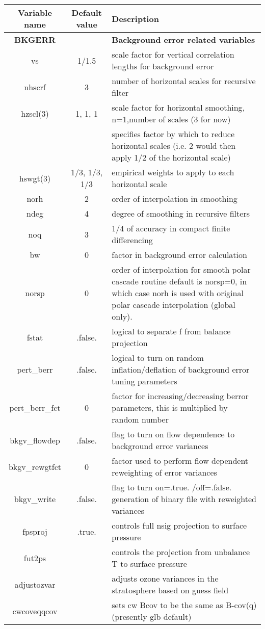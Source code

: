 \begin{table}[h]
 \footnotesize
 \center
 \begin{tabular}{| c | c | p{9cm} |}
 \hline
 Variable name & Default value & Description \\
 \hline
\textbf{BKGERR} &   & \textbf{Background error related variables} \\
 \hline 
 vs & 1/1.5 & scale factor for vertical correlation lengths for background error \\
 \hline
 nhscrf & 3	& number of horizontal scales for recursive filter \\
 \hline
 hzscl(3) & 1, 1, 1 & scale factor for horizontal smoothing, n=1,number of scales (3 for now) \\
         & & specifies factor by which to reduce horizontal scales (i.e. 2 would then apply 1/2 of the horizontal scale) \\
 \hline
 hswgt(3) & 1/3, 1/3, 1/3 & empirical weights to apply to each horizontal scale \\
 \hline
 norh & 2 & order of interpolation in smoothing \\
 \hline
 ndeg & 4 & degree of smoothing in recursive filters \\
 \hline
 noq & 3 & 1/4 of accuracy in compact finite differencing \\
 \hline
 bw & 0	& factor in background error calculation \\
 \hline
 norsp & 0 & order of interpolation for smooth polar cascade routine default is norsp=0, in which case norh is used with original polar cascade interpolation (global only). \\
 \hline
 fstat & .false. & logical to separate f from balance projection \\
 \hline
 pert\_berr	& .false. & logical to turn on random inflation/deflation of background error tuning parameters \\
 \hline
 pert\_berr\_fct & 0 & factor for increasing/decreasing berror parameters, this is multiplied by random number \\
 \hline
 bkgv\_flowdep & .false. & flag to turn on flow dependence to background error variances \\
 \hline
 bkgv\_rewgtfct & 0 & factor used to perform flow dependent reweighting of error variances \\
 \hline
 bkgv\_write & .false. & flag to turn on=.true. /off=.false. generation of binary file with reweighted variances \\
 \hline
 fpsproj & .true. & controls full nsig projection to surface pressure \\
 \hline
 fut2ps	& & controls the projection from unbalance T to surface pressure \\
 \hline
 adjustozvar & & adjusts ozone variances in the stratosphere based on guess field \\
 \hline
 cwcoveqqcov & & sets cw Bcov to be the same as B-cov(q) (presently glb default) \\
 \hline
 \end{tabular}
\end{table}

